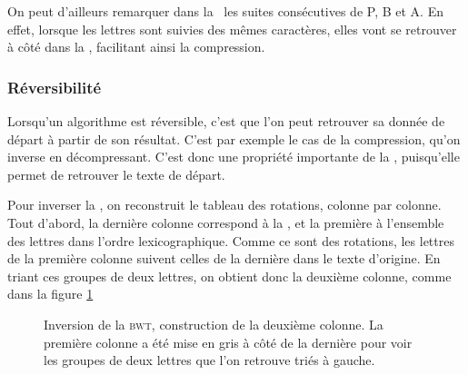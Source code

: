 On peut d'ailleurs remarquer dans la \bwt\ les suites consécutives de P, B et A. En effet, lorsque les lettres sont suivies des mêmes caractères, elles vont se retrouver à côté dans la \bwt, facilitant ainsi la compression.

\subsubsection{Réversibilité}
Lorsqu'un algorithme est réversible, c'est que l'on peut retrouver sa donnée de départ à partir de son résultat. C'est par exemple le cas de la compression, qu'on inverse en décompressant. C'est donc une propriété importante de la \bwt, puisqu'elle permet de retrouver le texte de départ.


Pour inverser la \bwt, on reconstruit le tableau des rotations, colonne par colonne.
Tout d'abord, la dernière colonne correspond à la \bwt, et la première à l'ensemble des lettres dans l'ordre lexicographique. Comme ce sont des rotations, les lettres de la première colonne suivent celles de la dernière dans le texte d'origine. En triant ces groupes de deux lettres, on obtient donc la deuxième colonne, comme dans la figure \ref{unbwt}

\begin{figure}[h!]
\caption{Inversion de la \textsc{bwt}, construction de la deuxième colonne. La première colonne a été mise en gris à côté de la dernière pour voir les groupes de deux lettres que l'on retrouve triés à gauche.}
\label{unbwt} 
\end{figure}

